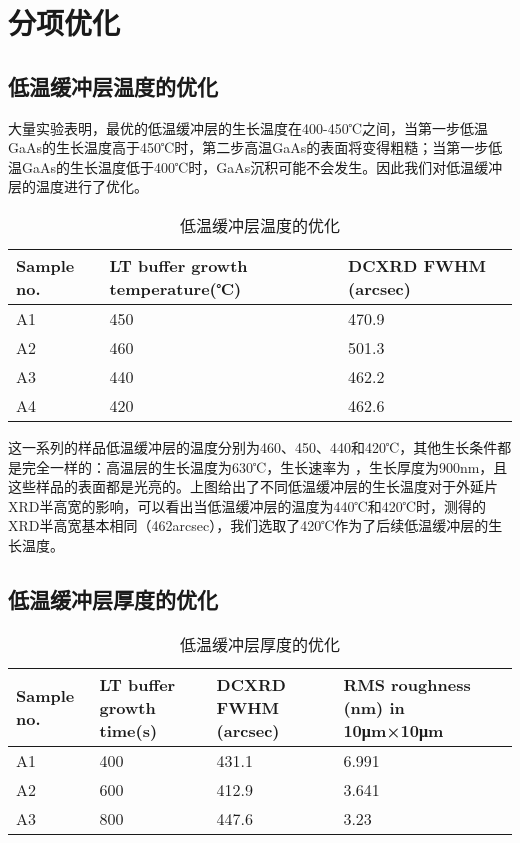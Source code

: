 \section{分项优化}

\subsection{低温缓冲层温度的优化}

大量实验表明，最优的低温缓冲层的生长温度在400-450℃之间，当第一步低温GaAs的生长温度高于450℃时，第二步高温GaAs的表面将变得粗糙；当第一步低温GaAs的生长温度低于400℃时，GaAs沉积可能不会发生。因此我们对低温缓冲层的温度进行了优化。

\begin{table*}[htbp] 
	\centering
	\caption{\label{tab:test1}低温缓冲层温度的优化}  
	\begin{tabular}{m{}<{\centering}m{}<{\centering}m{}<{\centering}}   
		\toprule
			Sample no. & LT buffer growth temperature(℃) & DCXRD FWHM (arcsec) \\
		\midrule 
			A1 & 450 & 470.9 \\
			A2 & 460 & 501.3 \\
			A3 & 440 & 462.2 \\
			A4 & 420 & 462.6 \\
		\bottomrule
	\end{tabular}
\end{table*}

这一系列的样品低温缓冲层的温度分别为460、450、440和420℃，其他生长条件都是完全一样的：高温层的生长温度为630℃，生长速率为        ，生长厚度为900nm，且这些样品的表面都是光亮的。上图给出了不同低温缓冲层的生长温度对于外延片XRD半高宽的影响，可以看出当低温缓冲层的温度为440℃和420℃时，测得的XRD半高宽基本相同（462arcsec），我们选取了420℃作为了后续低温缓冲层的生长温度。


\subsection{低温缓冲层厚度的优化}

\begin{table*}[htbp] 
	\centering
	\caption{\label{tab:test2}低温缓冲层厚度的优化}  
	\begin{tabular}{m{}<{\centering}m{}<{\centering}m{}<{\centering}m{}<{\centering}}   
		\toprule
			Sample no. & LT buffer growth time(s) & DCXRD FWHM (arcsec) & RMS roughness (nm) in 10μm×10μm \\
		\midrule
			A1 & 400 & 431.1 & 6.991 \\
			A2 & 600 & 412.9 & 3.641 \\
			A3 & 800 & 447.6 & 3.23 \\
		\bottomrule
	\end{tabular}
\end{table*}

